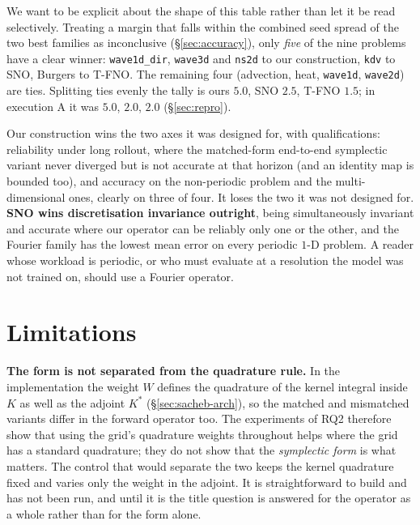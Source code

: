 \documentclass[11pt]{article}
\theoremstyle{definition}
\theoremstyle{remark}
\begin{document}
We want to be explicit about the shape of this table rather than let it be read
selectively. Treating a margin that falls within the combined seed spread of the
two best families as inconclusive (\S\ref{sec:accuracy}), only \emph{five} of the
nine problems have a clear winner: \texttt{wave1d\_dir}, \texttt{wave3d} and
\texttt{ns2d} to our construction, \texttt{kdv} to SNO, Burgers to T-FNO. The remaining
four (advection, heat, \texttt{wave1d}, \texttt{wave2d}) are ties. Splitting ties
evenly the tally is ours $5.0$, SNO $2.5$, T-FNO $1.5$; in execution A it was
$5.0$, $2.0$, $2.0$ (\S\ref{sec:repro}).

Our construction wins the two axes it was designed for, with qualifications:
reliability under long rollout, where the matched-form end-to-end symplectic variant
never diverged but is not accurate at that horizon (and an identity map is bounded
too), and accuracy on the non-periodic
problem and the multi-dimensional ones, clearly on three of four. It loses the
two it was not designed for. \textbf{SNO wins discretisation invariance
outright}, being simultaneously invariant and accurate where our operator can be
reliably only one or the other, and the Fourier family has the lowest mean error
on every periodic $1$-D problem. A reader whose workload is periodic, or who must
evaluate at a resolution the model was not trained on, should use a Fourier
operator.

\section{Limitations}
\label{sec:limits}

\textbf{The form is not separated from the quadrature rule.} In the
implementation the weight $W$ defines the quadrature of the kernel integral
inside $K$ as well as the adjoint $K^{*}$ (\S\ref{sec:sacheb-arch}), so the
matched and mismatched variants differ in the forward operator too. The
experiments of RQ2 therefore show that using the grid's quadrature weights
throughout helps where the grid has a standard quadrature; they do not show that
the \emph{symplectic form} is what matters. The control that would separate the
two keeps the kernel quadrature fixed and varies only the weight in the adjoint.
It is straightforward to build and has not been run, and until it is the title
question is answered for the operator as a whole rather than for the form alone.
\end{document}
